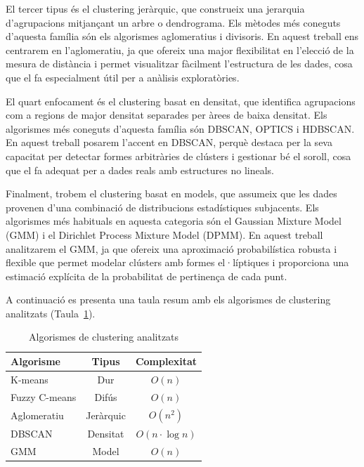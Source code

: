 \documentclass[a4paper,12pt]{report}
\begin{document}
El tercer tipus és el clustering jeràrquic, que construeix una jerarquia d’agrupacions mitjançant un arbre o dendrograma. Els mètodes més coneguts d’aquesta família són els algorismes aglomeratius i divisoris. En aquest treball ens centrarem en l’aglomeratiu, ja que ofereix una major flexibilitat en l'elecció de la mesura de distància i permet visualitzar fàcilment l’estructura de les dades, cosa que el fa especialment útil per a anàlisis exploratòries.

El quart enfocament és el clustering basat en densitat, que identifica agrupacions com a regions de major densitat separades per àrees de baixa densitat. Els algorismes més coneguts d’aquesta família són DBSCAN, OPTICS i HDBSCAN. En aquest treball posarem l’accent en DBSCAN, perquè destaca per la seva capacitat per detectar formes arbitràries de clústers i gestionar bé el soroll, cosa que el fa adequat per a dades reals amb estructures no lineals.

Finalment, trobem el clustering basat en models, que assumeix que les dades provenen d’una combinació de distribucions estadístiques subjacents. Els algorismes més habituals en aquesta categoria són el Gaussian Mixture Model (GMM) i el Dirichlet Process Mixture Model (DPMM). En aquest treball analitzarem el GMM, ja que ofereix una aproximació probabilística robusta i flexible que permet modelar clústers amb formes el·líptiques i proporciona una estimació explícita de la probabilitat de pertinença de cada punt.

A continuació es presenta una taula resum amb els algorismes de clustering analitzats (Taula~\ref{tab:algorithms}).

\begin{table}[H]
    \centering
    \begin{tabular}{|l|c|c|}
    \hline
    \textbf{Algorisme} & \textbf{Tipus} & \textbf{Complexitat} \\ \hline
    K-means & Dur  & $O(n)$ \\ \hline
    Fuzzy C-means & Difús  & $O(n)$ \\ \hline
    Aglomeratiu & Jeràrquic  & $O(n^2)$ \\ \hline
    DBSCAN & Densitat  & $O(n \cdot \log n)$ \\ \hline
    GMM & Model  & $O(n)$ \\ \hline
    \end{tabular}
    \caption{Algorismes de clustering analitzats}
    \label{tab:algorithms}
\end{table}
\end{document}
